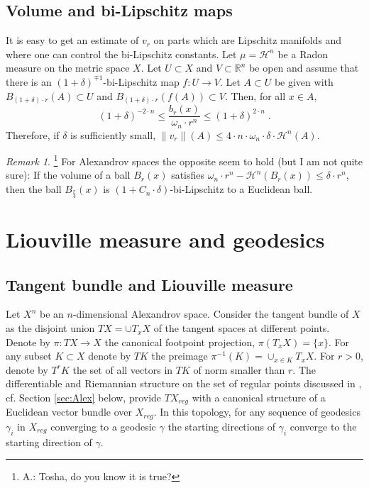 \documentclass[12pt,leqno,intlimits]{amsart}
\numberwithin{equation}{section}
\theoremstyle{definition}
\theoremstyle{remark}
\newtheorem{rem}[thm]{Remark}
\newcommand{\R}{\mathbb{R}}
\def\:{\colon}
\begin{document}
\subsection{Volume and bi-Lipschitz maps}
It is easy to get an estimate of $v_r$  on parts which are Lipschitz manifolds and where one can control the bi-Lipschitz constants.
Let $\mu =\mathcal H^n$ be a Radon measure on the metric space $X$.
Let $U\subset X$ and $V\subset \R^n$ be open and assume that there is an $(1+\delta)^{\mp1}$-bi-Lipschitz map
$f\:U \to V$.  %
 Let $A\subset U$ be given with
$B_{(1+\delta)\cdot r} (A) \subset U$ and $B_{(1+\delta)\cdot  r} (f(A)) \subset V$.  
Then, for all $x\in A$,
\begin{equation} \label{eq:bilip}
(1+\delta)  ^{-2\cdot n} \leq \frac {b_r(x)} {\omega_n\cdot  r^n} \leq (1+\delta ) ^{2\cdot n} \; .
\end{equation}
Therefore, if $\delta $ is sufficiently small,  $\|v_r \| (A) \leq  4\cdot  n \cdot \omega _n \cdot  \delta \cdot \mathcal H^n (A).$
\begin{rem}  \footnote{A.: Tosha, do you know it is true?} For Alexandrov  spaces the opposite seem to hold (but I am not quite sure):
If the volume of  a ball $B_r (x)$ satisfies $\omega _n\cdot  r^n -\mathcal H^n (B_r (x)) \leq \delta\cdot  r ^n$, then
the ball $B_{\frac r 4} (x)$ is  $(1+C_n\cdot  \delta )$-bi-Lipschitz  to a Euclidean ball.
\end{rem}





\section{Liouville measure and geodesics} \label{sec:Liou}
\subsection{Tangent bundle and Liouville measure} \label{subsec:tb}
Let $X^n$ be an $n$-dimensional Alexandrov space. Consider the tangent bundle of $X$
  as the  disjoint union $TX=\cup T_x X$ of the tangent spaces at different points. Denote by $\pi\:TX\to X$ the canonical footpoint projection, $\pi (T_xX) =\{x\}$.
	For any subset $K\subset X$ denote by $TK$ the preimage $\pi^{-1} (K)= \cup _{x\in K} T_xX$. For $r>0$, denote by $T^r K$ the set of all vectors in $TK$
	of norm smaller than $r$.
 The   differentiable and Riemannian structure on the set of regular points discussed in \cite{Otsu}, cf. Section \ref{sec:Alex} below,  provide  $TX_{reg}$ with a canonical structure of a Euclidean vector bundle over $X_{reg}$. In this topology, for any sequence of geodesics $\gamma _i$ in $X_{reg}$ converging to a geodesic $\gamma$ the starting directions of $\gamma _i$ converge to the starting direction of $\gamma$.
\end{document}
